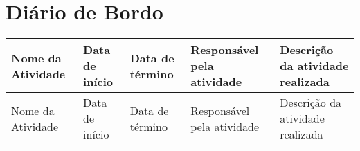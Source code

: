 \documentclass[
    landscape,
    a4paper,
    12pt,
    english,
    brazilian,
]{article}
\begin{document}
\section*{Diário de Bordo}

\begin{longtable}{|m{4cm}|m{2.8cm}|m{2.8cm}|m{4.8cm}|m{8cm}|} %
    \hline
    Nome da Atividade & Data de início & Data de término & Responsável pela atividade & Descrição da atividade realizada \\ \hline
    \endfirsthead
    \hline
    Nome da Atividade & Data de início & Data de término & Responsável pela atividade & Descrição da atividade realizada \\ \hline
    \endhead
    

\end{longtable}
\end{document}
